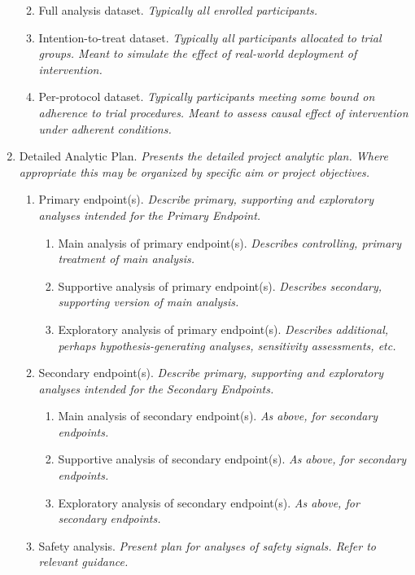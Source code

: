 \documentclass[]{book}
\providecommand{\tightlist}{%
  \setlength{\itemsep}{0pt}\setlength{\parskip}{0pt}}
\begin{document}
\begin{enumerate}
  \begin{enumerate}
  \def\labelenumii{\alph{enumii}.}
  \tightlist
  \item
    Full analysis dataset. \emph{Typically all enrolled participants.}
  \item
    Intention-to-treat dataset. \emph{Typically all participants
    allocated to trial groups. Meant to simulate the effect of
    real-world deployment of intervention.}
  \item
    Per-protocol dataset. \emph{Typically participants meeting some
    bound on adherence to trial procedures. Meant to assess causal
    effect of intervention under adherent conditions.}
  \end{enumerate}
\item
  Detailed Analytic Plan. \emph{Presents the detailed project analytic
  plan. Where appropriate this may be organized by specific aim or
  project objectives.}

  \begin{enumerate}
  \def\labelenumii{\alph{enumii}.}
  \tightlist
  \item
    Primary endpoint(s). \emph{Describe primary, supporting and
    exploratory analyses intended for the Primary Endpoint.}

    \begin{enumerate}
    \def\labelenumiii{\roman{enumiii}.}
    \tightlist
    \item
      Main analysis of primary endpoint(s). \emph{Describes controlling,
      primary treatment of main analysis.}
    \item
      Supportive analysis of primary endpoint(s). \emph{Describes
      secondary, supporting version of main analysis.}
    \item
      Exploratory analysis of primary endpoint(s). \emph{Describes
      additional, perhaps hypothesis-generating analyses, sensitivity
      assessments, etc.}
    \end{enumerate}
  \item
    Secondary endpoint(s). \emph{Describe primary, supporting and
    exploratory analyses intended for the Secondary Endpoints.}

    \begin{enumerate}
    \def\labelenumiii{\roman{enumiii}.}
    \tightlist
    \item
      Main analysis of secondary endpoint(s). \emph{As above, for
      secondary endpoints.}
    \item
      Supportive analysis of secondary endpoint(s). \emph{As above, for
      secondary endpoints.}
    \item
      Exploratory analysis of secondary endpoint(s). \emph{As above, for
      secondary endpoints.}
    \end{enumerate}
  \item
    Safety analysis. \emph{Present plan for analyses of safety signals.
    Refer to relevant guidance.}


\end{enumerate}
\end{enumerate}
\end{document}
